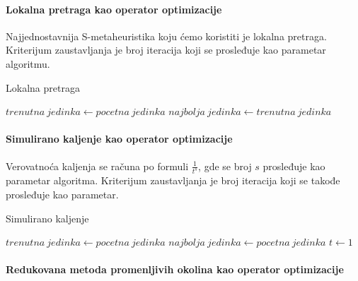 \documentclass[12pt, a4paper]{article}
\theoremstyle{definition}
\begin{document}
\paragraph{Lokalna pretraga kao operator optimizacije}

Najjednostavnija S-metaheuristika koju ćemo koristiti je lokalna pretraga. Kriterijum zaustavljanja je broj iteracija koji se prosleđuje kao parametar algoritmu.

\vspace{5mm}

\begin{algorithm}[H]
\caption{Lokalna pretraga}
\label{alg:3}
$trenutna\ jedinka \gets pocetna\ jedinka$\;
$najbolja\ jedinka \gets trenutna\ jedinka$\;
\end{algorithm}

\paragraph{Simulirano kaljenje kao operator optimizacije}

Verovatnoća kaljenja se računa po formuli $\frac{1}{t^s}$, gde se broj $s$ prosleđuje kao parametar algoritma. Kriterijum zaustavljanja je broj iteracija koji se takođe prosleđuje kao parametar.

\vspace{5mm}

\begin{algorithm}[H]
\caption{Simulirano kaljenje}
\label{alg:4}
$trenutna\ jedinka \gets pocetna\ jedinka$\;
$najbolja\ jedinka \gets pocetna\ jedinka$\;
$t \gets 1$\;
\end{algorithm}

\paragraph{Redukovana metoda promenljivih okolina kao operator optimizacije}
\end{document}

